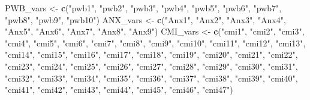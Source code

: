 \documentclass[
  11pt,
]{book}
\newenvironment{Shaded}{\begin{snugshade}}{\end{snugshade}}
\newcommand{\FunctionTok}[1]{\textcolor[rgb]{0.27,0.27,0.27}{\textbf{#1}}}
\newcommand{\NormalTok}[1]{#1}
\newcommand{\OtherTok}[1]{\textcolor[rgb]{0.37,0.37,0.37}{#1}}
\newcommand{\StringTok}[1]{\textcolor[rgb]{0.5,0.5,0.5}{#1}}
\begin{document}
\begin{Shaded}
\begin{Highlighting}[]
\NormalTok{PWB\_vars }\OtherTok{\textless{}{-}} \FunctionTok{c}\NormalTok{(}\StringTok{"pwb1"}\NormalTok{, }\StringTok{"pwb2"}\NormalTok{, }\StringTok{"pwb3"}\NormalTok{, }\StringTok{"pwb4"}\NormalTok{, }\StringTok{"pwb5"}\NormalTok{, }\StringTok{"pwb6"}\NormalTok{, }\StringTok{"pwb7"}\NormalTok{, }\StringTok{"pwb8"}\NormalTok{, }\StringTok{"pwb9"}\NormalTok{, }\StringTok{"pwb10"}\NormalTok{)}
\NormalTok{ANX\_vars }\OtherTok{\textless{}{-}} \FunctionTok{c}\NormalTok{(}\StringTok{"Anx1"}\NormalTok{, }\StringTok{"Anx2"}\NormalTok{, }\StringTok{"Anx3"}\NormalTok{, }\StringTok{"Anx4"}\NormalTok{, }\StringTok{"Anx5"}\NormalTok{, }\StringTok{"Anx6"}\NormalTok{, }\StringTok{"Anx7"}\NormalTok{, }\StringTok{"Anx8"}\NormalTok{, }\StringTok{"Anx9"}\NormalTok{)}
\NormalTok{CMI\_vars }\OtherTok{\textless{}{-}} \FunctionTok{c}\NormalTok{(}\StringTok{"cmi1"}\NormalTok{, }\StringTok{"cmi2"}\NormalTok{, }\StringTok{"cmi3"}\NormalTok{, }\StringTok{"cmi4"}\NormalTok{, }\StringTok{"cmi5"}\NormalTok{, }\StringTok{"cmi6"}\NormalTok{, }\StringTok{"cmi7"}\NormalTok{, }\StringTok{"cmi8"}\NormalTok{, }\StringTok{"cmi9"}\NormalTok{, }\StringTok{"cmi10"}\NormalTok{, }\StringTok{"cmi11"}\NormalTok{, }\StringTok{"cmi12"}\NormalTok{, }\StringTok{"cmi13"}\NormalTok{, }\StringTok{"cmi14"}\NormalTok{, }\StringTok{"cmi15"}\NormalTok{, }\StringTok{"cmi16"}\NormalTok{, }\StringTok{"cmi17"}\NormalTok{, }\StringTok{"cmi18"}\NormalTok{, }\StringTok{"cmi19"}\NormalTok{, }\StringTok{"cmi20"}\NormalTok{, }\StringTok{"cmi21"}\NormalTok{, }\StringTok{"cmi22"}\NormalTok{, }\StringTok{"cmi23"}\NormalTok{, }\StringTok{"cmi24"}\NormalTok{, }\StringTok{"cmi25"}\NormalTok{, }\StringTok{"cmi26"}\NormalTok{, }\StringTok{"cmi27"}\NormalTok{, }\StringTok{"cmi28"}\NormalTok{, }\StringTok{"cmi29"}\NormalTok{, }\StringTok{"cmi30"}\NormalTok{, }\StringTok{"cmi31"}\NormalTok{, }\StringTok{"cmi32"}\NormalTok{, }\StringTok{"cmi33"}\NormalTok{, }\StringTok{"cmi34"}\NormalTok{, }\StringTok{"cmi35"}\NormalTok{, }\StringTok{"cmi36"}\NormalTok{, }\StringTok{"cmi37"}\NormalTok{, }\StringTok{"cmi38"}\NormalTok{, }\StringTok{"cmi39"}\NormalTok{, }\StringTok{"cmi40"}\NormalTok{, }\StringTok{"cmi41"}\NormalTok{, }\StringTok{"cmi42"}\NormalTok{, }\StringTok{"cmi43"}\NormalTok{, }\StringTok{"cmi44"}\NormalTok{, }\StringTok{"cmi45"}\NormalTok{, }\StringTok{"cmi46"}\NormalTok{, }\StringTok{"cmi47"}\NormalTok{)}

\end{Highlighting}
\end{Shaded}
\end{document}

